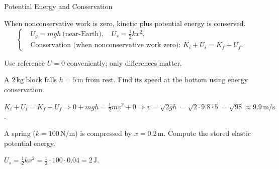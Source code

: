 \begin{KnowledgePoint}{Potential Energy and Conservation \Core}
  \KPFormulas
\begin{formulabox}
  When nonconservative work is zero, kinetic plus potential energy is conserved.
  \[
  \left\{\begin{aligned}
    &U_g=mgh\ \text{(near-Earth)},\quad U_s=\tfrac12 kx^2,\\
    &\text{Conservation (when nonconservative work zero): }K_i+U_i=K_f+U_f.
  \end{aligned}\right.
  \]
  \end{formulabox}

  \KPHeuristics
  \begin{heuristicsbox}
  Use reference $U=0$ conveniently; only differences matter.
  \end{heuristicsbox}

  \KPProblems
\begin{cheatproblem}
  A $2\,\text{kg}$ block falls $h=5\,\text{m}$ from rest. Find its speed at the bottom using energy conservation.
\begin{solutionbox}
  $K_i+U_i=K_f+U_f\Rightarrow0+mgh=\tfrac12mv^2+0\Rightarrow v=\sqrt{2gh}=\sqrt{2\cdot9.8\cdot5}=\sqrt{98}\approx9.9\,\text{m/s}$.
\end{solutionbox}
\end{cheatproblem}
\begin{cheatproblem}
  A spring ($k=100\,\text{N/m}$) is compressed by $x=0.2\,\text{m}$. Compute the stored elastic potential energy.
\begin{solutionbox}
  $U_s=\tfrac12 kx^2=\tfrac12\cdot100\cdot0.04=2\,\text{J}$.
\end{solutionbox}
\end{cheatproblem}
\end{KnowledgePoint}

